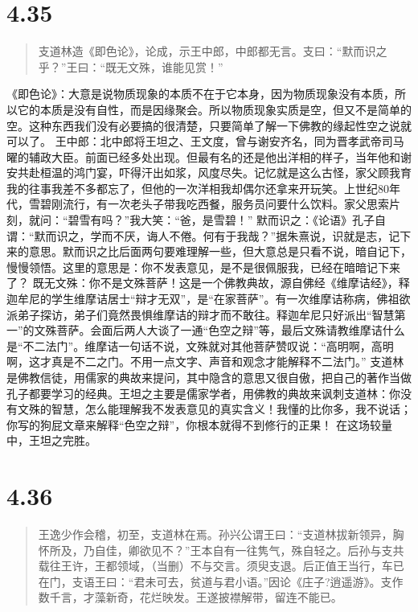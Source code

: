 \documentclass[]{book}
\begin{document}
\section{4.35}\label{section-213}

\begin{quote}
支道林造《即色论》，论成，示王中郎，中郎都无言。支曰：``默而识之乎？''王曰：``既无文殊，谁能见赏！''
\end{quote}

《即色论》：大意是说物质现象的本质不在于它本身，因为物质现象没有本质，所以它的本质是没有自性，而是因缘聚会。所以物质现象实质是空，但又不是简单的空。这种东西我们没有必要搞的很清楚，只要简单了解一下佛教的缘起性空之说就可以了。
王中郎：北中郎将王坦之、王文度，曾与谢安齐名，同为晋孝武帝司马曜的辅政大臣。前面已经多处出现。但最有名的还是他出洋相的样子，当年他和谢安共赴桓温的鸿门宴，吓得汗出如浆，风度尽失。记忆就是这么古怪，家父顾我育我的往事我差不多都忘了，但他的一次洋相我却偶尔还拿来开玩笑。上世纪80年代，雪碧刚流行，有一次老头子带我吃西餐，服务员问要什么饮料。家父思索片刻，就问：``碧雪有吗？''我大笑：``爸，是雪碧！''
默而识之：《论语》孔子自谓：``默而识之，学而不厌，诲人不倦。何有于我哉？''据朱熹说，识就是志，记下来的意思。默而识之比后面两句要难理解一些，但大意总是只看不说，暗自记下，慢慢领悟。这里的意思是：你不发表意见，是不是很佩服我，已经在暗暗记下来了？
既无文殊：你不是文殊菩萨！这是一个佛教典故，源自佛经《维摩诘经》，释迦牟尼的学生维摩诘居士``辩才无双''，是``在家菩萨''。有一次维摩诘称病，佛祖欲派弟子探访，弟子们竟然畏惧维摩诘的辩才而不敢往。释迦牟尼只好派出``智慧第一''的文殊菩萨。会面后两人大谈了一通``色空之辩''等，最后文殊请教维摩诘什么是``不二法门''。维摩诘一句话不说，文殊就对其他菩萨赞叹说：``高明啊，高明啊，这才真是不二之门。不用一点文字、声音和观念才能解释不二法门。''
支道林是佛教信徒，用儒家的典故来提问，其中隐含的意思又很自傲，把自己的著作当做孔子都要学习的经典。王坦之主要是儒家学者，用佛教的典故来讽刺支道林：你没有文殊的智慧，怎么能理解我不发表意见的真实含义！我懂的比你多，我不说话；你写的狗屁文章来解释``色空之辩''，你根本就得不到修行的正果！
在这场较量中，王坦之完胜。

\section{4.36}\label{section-214}

\begin{quote}
王逸少作会稽，初至，支道林在焉。孙兴公谓王曰：``支道林拔新领异，胸怀所及，乃自佳，卿欲见不？''王本自有一往隽气，殊自轻之。后孙与支共载往王许，王都领域，（当删）不与交言。须臾支退。后正值王当行，车已在门，支语王曰：``君未可去，贫道与君小语。''因论《庄子?逍遥游》。支作数千言，才藻新奇，花烂映发。王遂披襟解带，留连不能已。
\end{quote}
\end{document}
